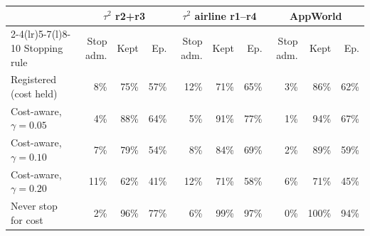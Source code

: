 \begin{tabular}{@{}lrrrrrrrrr@{}}
\toprule
 & \multicolumn{3}{c}{$\tau^2$ r2+r3} & \multicolumn{3}{c}{$\tau^2$ airline r1--r4} & \multicolumn{3}{c}{AppWorld} \\
\cmidrule(lr){2-4}\cmidrule(lr){5-7}\cmidrule(l){8-10}
Stopping rule & Stop adm. & Kept & Ep. & Stop adm. & Kept & Ep. & Stop adm. & Kept & Ep. \\
\midrule
Registered (cost held) & 8\% & 75\% & 57\% & 12\% & 71\% & 65\% & 3\% & 86\% & 62\% \\
Cost-aware, $\gamma=0.05$ & 4\% & 88\% & 64\% & 5\% & 91\% & 77\% & 1\% & 94\% & 67\% \\
Cost-aware, $\gamma=0.10$ & 7\% & 79\% & 54\% & 8\% & 84\% & 69\% & 2\% & 89\% & 59\% \\
Cost-aware, $\gamma=0.20$ & 11\% & 62\% & 41\% & 12\% & 71\% & 58\% & 6\% & 71\% & 45\% \\
Never stop for cost & 2\% & 96\% & 77\% & 6\% & 99\% & 97\% & 0\% & 100\% & 94\% \\
\bottomrule
\end{tabular}
